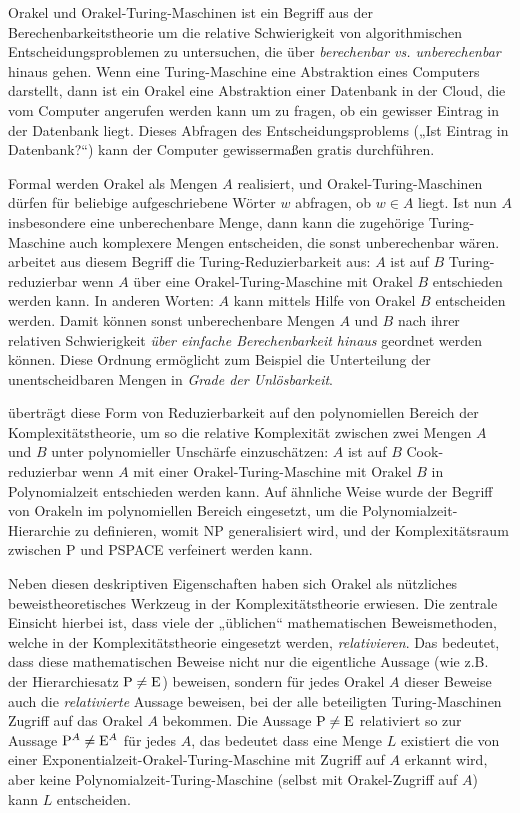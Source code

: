 Orakel und Orakel-Turing-Maschinen ist ein Begriff aus der Berechenbarkeitstheorie um die relative Schwierigkeit von algorithmischen Entscheidungsproblemen zu untersuchen, die über \emph{berechenbar vs. unberechenbar} hinaus gehen. Wenn eine Turing-Maschine eine Abstraktion eines Computers darstellt, dann ist ein Orakel eine Abstraktion einer Datenbank in der Cloud, die vom Computer angerufen werden kann um zu fragen, ob ein gewisser Eintrag in der Datenbank liegt. Dieses Abfragen des Entscheidungsproblems („Ist Eintrag in Datenbank?“) kann der Computer gewissermaßen gratis durchführen.

Formal werden Orakel als Mengen $A$ realisiert, und Orakel-Turing-Maschinen dürfen für beliebige aufgeschriebene Wörter $w$ abfragen, ob $w\in A$ liegt. Ist nun $A$ insbesondere eine unberechenbare Menge, dann kann die zugehörige Turing-Maschine auch komplexere Mengen entscheiden, die sonst unberechenbar wären.
\textcite{post_recursively_1944} arbeitet aus diesem Begriff die Turing-Reduzierbarkeit aus: $A$ ist auf $B$ Turing-reduzierbar wenn $A$ über eine Orakel-Turing-Maschine mit Orakel $B$ entschieden werden kann. In anderen Worten: $A$ kann mittels Hilfe von Orakel $B$ entscheiden werden.  Damit können sonst unberechenbare Mengen $A$ und $B$ nach ihrer relativen Schwierigkeit \emph{über einfache Berechenbarkeit hinaus} geordnet werden können. Diese Ordnung ermöglicht zum Beispiel die Unterteilung der unentscheidbaren Mengen in \emph{Grade der Unlösbarkeit}.

\textcite{cook_complexity_1971} überträgt diese Form von Reduzierbarkeit auf den polynomiellen Bereich der Komplexitätstheorie, um so die relative Komplexität zwischen zwei Mengen $A$ und $B$ unter polynomieller Unschärfe einzuschätzen: $A$ ist auf $B$ Cook-reduzierbar wenn $A$ mit einer Orakel-Turing-Maschine mit Orakel $B$ in Polynomialzeit entschieden werden kann. Auf ähnliche Weise wurde der Begriff von Orakeln im polynomiellen Bereich eingesetzt, um die Polynomialzeit-Hierarchie zu definieren, womit NP generalisiert wird, und der Komplexitätsraum zwischen P und PSPACE verfeinert werden kann.

Neben diesen deskriptiven Eigenschaften haben sich Orakel als nützliches beweistheoretisches Werkzeug in der Komplexitätstheorie erwiesen. Die zentrale Einsicht hierbei ist, dass viele der „üblichen“ mathematischen Beweismethoden, welche in der Komplexitätstheorie eingesetzt werden, \emph{relativieren}. Das bedeutet, dass diese mathematischen Beweise nicht nur die eigentliche Aussage (wie z.B. der Hierarchiesatz $\P\neq \mathrm{E}$) beweisen, sondern für jedes Orakel $A$ dieser Beweise auch die \emph{relativierte} Aussage beweisen, bei der  alle beteiligten Turing-Maschinen Zugriff auf das Orakel $A$ bekommen. Die Aussage $\P\neq \mathrm{E}$ relativiert so zur Aussage $\P^A\neq \mathrm{E}^A$ für jedes $A$, das bedeutet dass eine Menge $L$ existiert die von einer Exponentialzeit-Orakel-Turing-Maschine mit Zugriff auf $A$ erkannt wird, aber keine Polynomialzeit-Turing-Maschine (selbst mit Orakel-Zugriff auf $A$) kann $L$ entscheiden.

